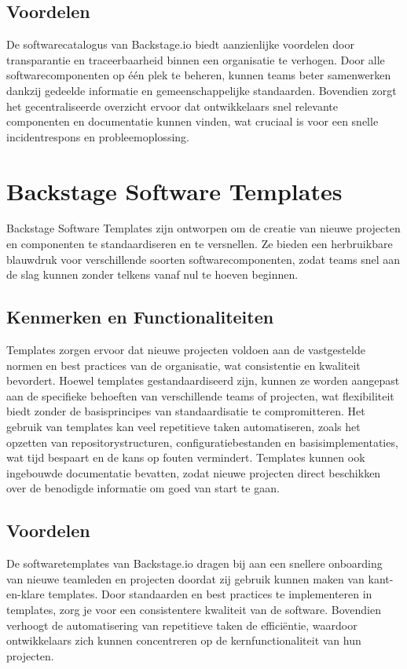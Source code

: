\subsection{Voordelen}

De softwarecatalogus van Backstage.io biedt aanzienlijke voordelen door transparantie en traceerbaarheid binnen een organisatie te verhogen. Door alle softwarecomponenten op één plek te beheren, kunnen teams beter samenwerken dankzij gedeelde informatie en gemeenschappelijke standaarden. Bovendien zorgt het gecentraliseerde overzicht ervoor dat ontwikkelaars snel relevante componenten en documentatie kunnen vinden, wat cruciaal is voor een snelle incidentrespons en probleemoplossing.

\section{Backstage Software Templates}

Backstage Software Templates zijn ontworpen om de creatie van nieuwe projecten en componenten te standaardiseren en te versnellen. Ze bieden een herbruikbare blauwdruk voor verschillende soorten softwarecomponenten, zodat teams snel aan de slag kunnen zonder telkens vanaf nul te hoeven beginnen.

\subsection{Kenmerken en Functionaliteiten}

Templates zorgen ervoor dat nieuwe projecten voldoen aan de vastgestelde normen en best practices van de organisatie, wat consistentie en kwaliteit bevordert. Hoewel templates gestandaardiseerd zijn, kunnen ze worden aangepast aan de specifieke behoeften van verschillende teams of projecten, wat flexibiliteit biedt zonder de basisprincipes van standaardisatie te compromitteren. Het gebruik van templates kan veel repetitieve taken automatiseren, zoals het opzetten van repositorystructuren, configuratiebestanden en basisimplementaties, wat tijd bespaart en de kans op fouten vermindert. Templates kunnen ook ingebouwde documentatie bevatten, zodat nieuwe projecten direct beschikken over de benodigde informatie om goed van start te gaan.

\subsection{Voordelen}

De softwaretemplates van Backstage.io dragen bij aan een snellere onboarding van nieuwe teamleden en projecten doordat zij gebruik kunnen maken van kant-en-klare templates. Door standaarden en best practices te implementeren in templates, zorg je voor een consistentere kwaliteit van de software. Bovendien verhoogt de automatisering van repetitieve taken de efficiëntie, waardoor ontwikkelaars zich kunnen concentreren op de kernfunctionaliteit van hun projecten.

